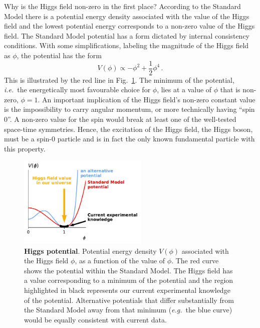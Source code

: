 \documentclass{article}
\begin{document}
Why is the Higgs field non-zero in the first place?
%
According to the Standard Model there is a
potential energy density associated with the value of the Higgs field
and the lowest potential energy corresponds to a non-zero value
of the Higgs field.
%
%
The Standard Model potential has a form dictated by 
internal consistency conditions.
%
With some simplifications, labeling the magnitude of the Higgs field
as $\phi$, the potential has the form
\begin{equation}
  \label{eq:Vphi}
  V(\phi) \propto -\phi^2 + \frac12 \phi^4\,.
\end{equation}
%
This is illustrated by the red line in
Fig.~\ref{fig:higgs-potential}.
%
The minimum of the potential, {\it i.e.}\ the energetically most favourable
choice for $\phi$, lies at a value of $\phi$ that is non-zero,
$\phi = 1$.
%
An important implication of the Higgs field's non-zero
constant value is the impossibility to carry angular momentum,
or more technically having ``spin 0''.
%
A non-zero value for the spin would break at least one of the well-tested
space-time symmetries.
%
Hence, the excitation of the Higgs field, the Higgs boson, must be a
spin-0 particle and is in fact the only known fundamental particle with this property.

\begin{figure}[t]
  \centering
  \includegraphics[width=0.55\textwidth]{figs/potential-half-v2.pdf}
  \caption{{\bf Higgs potential}.
    Potential energy density $V(\phi)$ associated with the
    Higgs field $\phi$, as a function of the value of $\phi$.
    The red curve shows the potential within the Standard Model.
    The Higgs field has a value corresponding to a minimum of the
    potential and the region highlighted in black represents our current
    experimental knowledge of the potential.
    Alternative potentials that differ substantially from the Standard
    Model away from that
    minimum ({\it e.g.}\ the blue curve) would be equally consistent with
    current data.  
}
  \label{fig:higgs-potential}
\end{figure}
\end{document}
